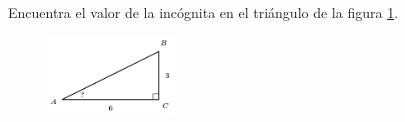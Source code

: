 \question[15]  Encuentra el valor de la incógnita en el triángulo de la figura \ref{fig:angle_functrig_28}.
\begin{figure}[H]
    \begin{center}
        \includegraphics[width=0.3\textwidth]{../images/angle_functrig_28.png}
    \end{center}
    \caption{}
    \label{fig:angle_functrig_28}
\end{figure}